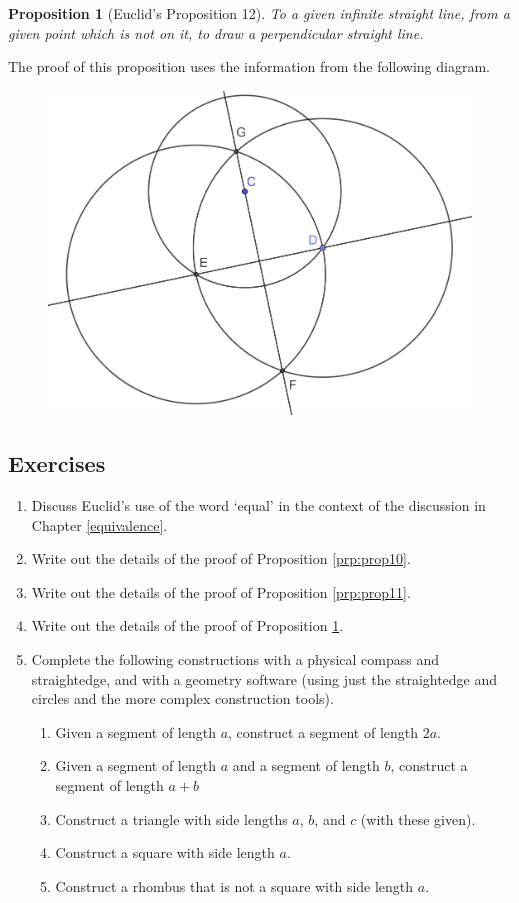 \documentclass[
]{book}
\providecommand{\tightlist}{%
  \setlength{\itemsep}{0pt}\setlength{\parskip}{0pt}}
\newtheorem{proposition}{Proposition}[chapter]
\theoremstyle{definition}
\theoremstyle{definition}
\theoremstyle{definition}
\theoremstyle{definition}
\theoremstyle{remark}
\begin{document}
\begin{proposition}[Euclid's Proposition 12]
\protect\hypertarget{prp:prop12}{}\label{prp:prop12}To a given infinite straight line, from a given point which is not on it, to draw a perpendicular straight line.
\end{proposition}

The proof of this proposition uses the information from the following diagram.

\begin{figure}

{\centering \includegraphics[width=0.45\linewidth]{images/Prop12} 

}

\end{figure}

\hypertarget{exercises-39}{%
\subsection{Exercises}\label{exercises-39}}

\begin{enumerate}
\def\labelenumi{\arabic{enumi}.}
\item
  Discuss Euclid's use of the word `equal' in the context of the discussion in Chapter \ref{equivalence}.
\item
  Write out the details of the proof of Proposition \ref{prp:prop10}.
\item
  Write out the details of the proof of Proposition \ref{prp:prop11}.
\item
  Write out the details of the proof of Proposition \ref{prp:prop12}.
\item
  Complete the following constructions with a physical compass and straightedge, and with a geometry software (using just the straightedge and circles and the more complex construction tools).

  \begin{enumerate}
  \def\labelenumii{\alph{enumii}.}
  \tightlist
  \item
    Given a segment of length \(a\), construct a segment of length \(2a\).
  \item
    Given a segment of length \(a\) and a segment of length \(b\), construct a segment of length \(a+b\)
  \item
    Construct a triangle with side lengths \(a\), \(b\), and \(c\) (with these given).
  \item
    Construct a square with side length \(a\).
  \item
    Construct a rhombus that is not a square with side length \(a\).
  \end{enumerate}
\end{enumerate}
\end{document}

